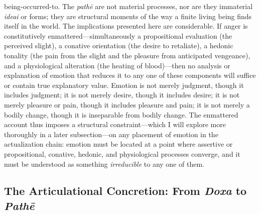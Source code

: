 \documentclass{article}
\begin{document}
being-occurred-to. The \textit{pathē} are not material processes, nor are they immaterial \textit{ideai} or forms; they are structural moments of the way a finite living being finds itself in the world. The implications presented here are considerable. If anger is constitutively enmattered---simultaneously a propositional evaluation (the perceived slight), a conative orientation (the desire to retaliate), a hedonic tonality (the pain from the slight and the pleasure from anticipated vengeance), and a physiological alteration (the heating of blood)---then no analysis or explanation of emotion that reduces it to any one of these components will suffice or contain true explanatory value. Emotion is not merely judgment, though it includes judgment; it is not merely desire, though it includes desire; it is not merely pleasure or pain, though it includes pleasure and pain; it is not merely a bodily change, though it is inseparable from bodily change. The enmattered account thus imposes a structural constraint---which I will explore more thoroughly in a later subsection---on any placement of emotion in the actualization chain: emotion must be located at a point where assertive or propositional, conative, hedonic, and physiological processes converge, and it must be understood as something \textit{irreducible} to any one of them.

\subsection{The Articulational Concretion: From \textit{Doxa} to \textit{Pathē}}
\end{document}
